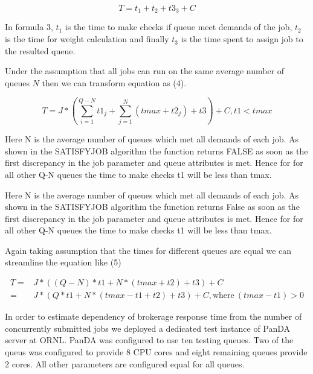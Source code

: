 \begin{equation}
T = t_1 + t_2 + t3_3 + C
\end{equation}

In formula 3, $t_1$ is the time to make checks if queue meet demands of the
job, $t_2$ is the time for weight calculation and finally $t_3$ is the time
spent to assign job to the resulted queue. 

Under the assumption that all jobs can run on the same average number of queues
$N$ then we can transform equation as (4).

\begin{equation}
T = J * \left ( \sum_{i = 1}^{Q - N} t1_j + \sum_{j = 1}^{N} (tmax + t2_j) + t3 \right) + C, t1 < tmax
\end{equation}

Here N is the average number of queues which met all demands of each job.  As shown in the SATISFY{\textunderscore}JOB algorithm the function returns FALSE as soon as the first discrepancy in the job parameter and queue attributes is met. Hence for for all other Q-N queues the time to make checks  t1 will be less than tmax.

Here N is the average number of queues which met all demands of each job. As shown in the SATISFY{\textunderscore}JOB algorithm the function returns False as
soon as the first discrepancy in the job parameter and queue attributes is met.
Hence for for all other Q-N queues the time to make checks t1 will be less than tmax.

Again taking assumption that the times for different queues are equal we can
streamline the equation like (5)

\begin{equation}
  \begin{aligned}
    T =& J * \left(( Q - N) * t1 + N * (tmax + t2) + t3 \right) + C \\
     =& J * \left(Q * t1 + N * (tmax - t1 + t2) + t3 \right) + C,
        \text{where}~(tmax - t1) > 0
  \end{aligned}
\end{equation}

In order to estimate dependency of brokerage response time from the number of
concurrently submitted jobs we deployed a dedicated test instance of PanDA
server at ORNL. PanDA was configured to use ten testing queues. Two of the
queus was configured to provide 8 CPU cores and eight remaining queues provide
2 cores. All other parameters are configured equal for all queues.

